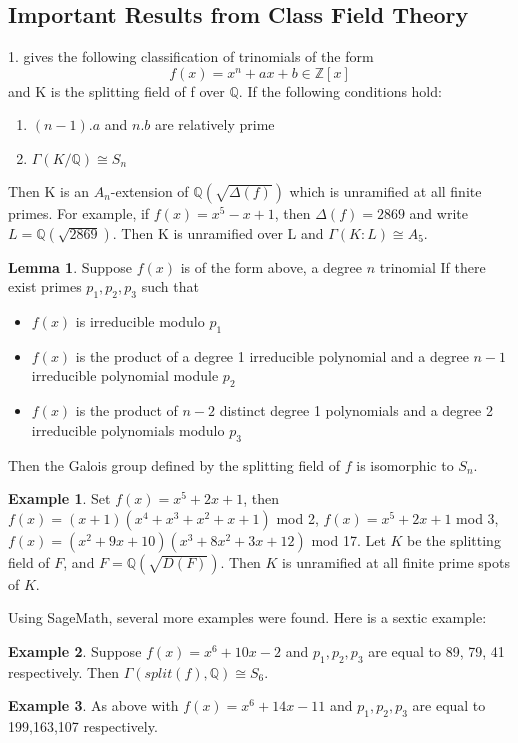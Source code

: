\documentclass[12pt]{extarticle}
\newcommand{\Q}{\mathbb{Q}}
\newcommand{\<}{\langle}
\renewcommand{\>}{\rangle}
\theoremstyle{definition}
\newtheorem*{example}{Example}
\newtheorem{lemma}{Lemma}
\begin{document}
\subsection{Important Results from Class Field Theory}

1. \cite{YAMA1970} gives the following classification of trinomials of the form 
\begin{equation}
    f(x) = x^n+ax+b \in \mathbb{Z}[x]
\end{equation}and K is the splitting field of f over $\Q$.
If the following conditions hold:
\begin{enumerate}
    \item $(n-1).a$ and $n.b$ are relatively prime 
    \item $\Gamma(K/\mathbb{Q}) \cong S_n$
\end{enumerate}\par
Then K is an $A_n$-extension of $\Q\left( \sqrt{\Delta(f)}\right)$ which is unramified at all finite primes. For example, if $f(x) = x^5-x+1$, then $\Delta(f)= 2869$ and write $L = \Q(\sqrt{2869})$. Then K is unramified over L and $\Gamma(K:L)\cong A_5.$
\begin{lemma}
Suppose $f(x)$ is of the form above, a degree $n$ trinomial If there exist primes $p_1,p_2,p_3$ such that \begin{itemize}
\item $f(x)$ is irreducible modulo $p_1$
\item $f(x)$ is the product of a degree 1 irreducible polynomial and a degree $n-1$ irreducible polynomial module $p_2$
\item $f(x)$ is the product of $n-2$ distinct degree 1 polynomials and a degree 2 irreducible polynomials modulo $p_3$
\end{itemize}
Then the Galois group defined by the splitting field of $f$ is isomorphic to $S_n$.
\end{lemma}
\begin{example}
Set $f(x)= x^5+2x+1$, then $f(x)= (x+1)(x^4+x^3+x^2+x+1)$ mod 2, 
$f(x)=x^5+2x+1$ mod 3, $f(x)=(x^2+9x+10)(x^3+8x^2+3x+12)$ mod 17. Let $K$ be the splitting field of $F$, and $F = \Q(\sqrt{D(F)})$. Then $K$ is unramified at all finite prime spots of $K$. 
\end{example}
Using SageMath, several more examples were found. 
Here is a sextic example:
\begin{example}
Suppose $f(x)=x^6+10x-2$ and $p_1,p_2,p_3$ are equal to 89, 79, 41 respectively. 
Then $\Gamma(split(f),\Q) \cong S_6$.
\end{example}
\begin{example}
As above with $f(x)=x^6+14x-11$ and $p_1,p_2,p_3$ are equal to 199,163,107 respectively. 
\end{example}
\end{document}

